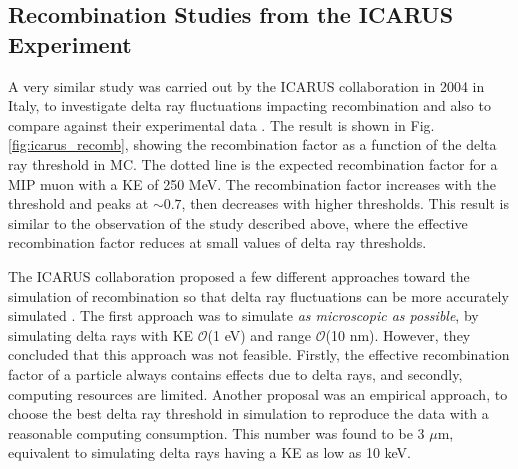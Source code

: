 %

\subsection{Recombination Studies from the ICARUS Experiment}
\label{sec:icarus}


A very similar study was carried out by the ICARUS collaboration in 2004 in Italy, to investigate delta ray fluctuations impacting recombination and also to compare against their experimental data \cite{icarus_recomb}. 
The result is shown in Fig. \ref{fig:icarus_recomb}, showing the recombination factor as a function of the delta ray threshold in MC. 
The dotted line is the expected recombination factor for a MIP muon with a KE of 250 MeV.
The recombination factor increases with the threshold and peaks at $\sim0.7$, then decreases with higher thresholds. 
This result is similar to the observation of the study described above, where the effective recombination factor reduces at small values of delta ray thresholds.

The ICARUS collaboration proposed a few different approaches toward the simulation of recombination so that delta ray fluctuations can be more accurately simulated \cite{icarus_recomb}. 
The first approach was to simulate \textit{as microscopic as possible}, by simulating delta rays with KE $\mathcal{O}$(1 eV) and range $\mathcal{O}$(10 nm).
However, they concluded that this approach was not feasible.
Firstly, the effective recombination factor of a particle always contains effects due to delta rays, and secondly, computing resources are limited.
Another proposal was an empirical approach, to choose the best delta ray threshold in simulation to reproduce the data with a reasonable computing consumption.
This number was found to be 3 $\mu$m, equivalent to simulating delta rays having a KE as low as 10 keV.


